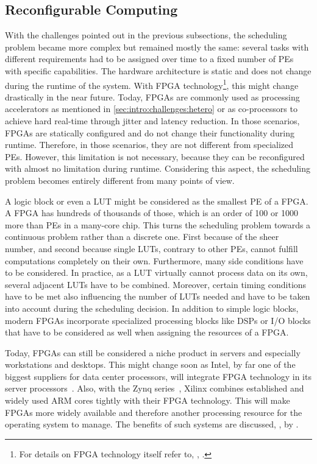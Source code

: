 \subsection{Reconfigurable Computing}%
\label{sec:intro:anycore}

With the challenges pointed out in the previous subsections, the scheduling problem became more complex but remained mostly the same: several tasks with different requirements had to be assigned over time to a fixed number of \acp{PE} with specific capabilities. The hardware architecture is static and does not change during the runtime of the system. With \ac{FPGA} technology\footnote{For details on \ac{FPGA} technology itself refer to, \eg, \textcite{Compton-2002-FGPAGeneral}.}, this might change drastically in the near future. Today, \acp{FPGA} are commonly used as processing accelerators as mentioned in \cref{sec:intro:challenges:hetero} or as co-processors to achieve hard real-time through jitter and latency reduction. In those scenarios, \acp{FPGA} are statically configured and do not change their functionality during runtime. Therefore, in those scenarios, they are not different from specialized \acp{PE}. However, this limitation is not necessary, because they can be reconfigured with almost no limitation during runtime. Considering this aspect, the scheduling problem becomes entirely different from many points of view.

A logic block or even a \ac{LUT} might be considered as the smallest \ac{PE} of a \ac{FPGA}. A \ac{FPGA} has hundreds of thousands of those, which is an order of \num{100} or \num{1000} more than \acp{PE} in a many-core chip. This turns the scheduling problem towards a continuous problem rather than a discrete one. First because of the sheer number, and second because single \acp{LUT}, contrary to other \acp{PE}, cannot fulfill computations completely on their own. Furthermore, many side conditions have to be considered. In practice, as a \ac{LUT} virtually cannot process data on its own, several adjacent \acp{LUT} have to be combined. Moreover, certain timing conditions have to be met also influencing the number of \acp{LUT} needed and have to be taken into account during the scheduling decision. In addition to simple logic blocks, modern \acp{FPGA} incorporate specialized processing blocks like \acp{DSP} or I/O blocks that have to be considered as well when assigning the resources of a \ac{FPGA}.

Today, \acp{FPGA} can still be considered a niche product in servers and especially workstations and desktops. This might change soon as Intel, by far one of the biggest suppliers for data center processors, will integrate \ac{FPGA} technology in its server processors~\cite{Bryant-2014-XeonFPGA}. Also, with the Zynq series~\cite{Xilinx-2016-Zynq}, Xilinx combines established and widely used ARM cores tightly with their \ac{FPGA} technology. This will make \acp{FPGA} more widely available and therefore another processing resource for the operating system to manage. The benefits of such systems are discussed, \eg, by \textcite{Chung-2010-Singl-ChipHetero}.

